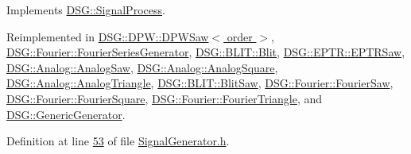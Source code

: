 Implements \hyperlink{class_d_s_g_1_1_signal_process_a2c8ff3487d9c43f9eace1d9192d4a37e}{D\+S\+G\+::\+Signal\+Process}.



Reimplemented in \hyperlink{class_d_s_g_1_1_d_p_w_1_1_d_p_w_saw_a03548019c5ec057f5980a4bd99a0d3f0}{D\+S\+G\+::\+D\+P\+W\+::\+D\+P\+W\+Saw$<$ order $>$}, \hyperlink{class_d_s_g_1_1_fourier_1_1_fourier_series_generator_adce79a239104570f8a6565e708fb70a7}{D\+S\+G\+::\+Fourier\+::\+Fourier\+Series\+Generator}, \hyperlink{class_d_s_g_1_1_b_l_i_t_1_1_blit_aab7c67ff8f059c8367ba316cf8cd5436}{D\+S\+G\+::\+B\+L\+I\+T\+::\+Blit}, \hyperlink{class_d_s_g_1_1_e_p_t_r_1_1_e_p_t_r_saw_a9dbefaeeb74e30e722bb5d8ea767cdca}{D\+S\+G\+::\+E\+P\+T\+R\+::\+E\+P\+T\+R\+Saw}, \hyperlink{class_d_s_g_1_1_analog_1_1_analog_saw_a38f091059d924c9141fee3e27522e7e1}{D\+S\+G\+::\+Analog\+::\+Analog\+Saw}, \hyperlink{class_d_s_g_1_1_analog_1_1_analog_square_af4d41d5894ae02e920c61e06cf041c60}{D\+S\+G\+::\+Analog\+::\+Analog\+Square}, \hyperlink{class_d_s_g_1_1_analog_1_1_analog_triangle_a568c994e0f83f6a01d813357259a8f37}{D\+S\+G\+::\+Analog\+::\+Analog\+Triangle}, \hyperlink{class_d_s_g_1_1_b_l_i_t_1_1_blit_saw_ad2edba8ed83558e76afed6ec1d5cf4d6}{D\+S\+G\+::\+B\+L\+I\+T\+::\+Blit\+Saw}, \hyperlink{class_d_s_g_1_1_fourier_1_1_fourier_saw_ac890d9f0af523b63b96b07e6696a32b7}{D\+S\+G\+::\+Fourier\+::\+Fourier\+Saw}, \hyperlink{class_d_s_g_1_1_fourier_1_1_fourier_square_a46028a3615f26876f9c613f983141362}{D\+S\+G\+::\+Fourier\+::\+Fourier\+Square}, \hyperlink{class_d_s_g_1_1_fourier_1_1_fourier_triangle_a27b082e69cc7d70223dd3fbc552ba5bc}{D\+S\+G\+::\+Fourier\+::\+Fourier\+Triangle}, and \hyperlink{class_d_s_g_1_1_generic_generator_a886544537d2f77243ec42dad9f124a8d}{D\+S\+G\+::\+Generic\+Generator}.



Definition at line \hyperlink{_signal_generator_8h_source_l00053}{53} of file \hyperlink{_signal_generator_8h_source}{Signal\+Generator.\+h}.


